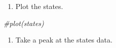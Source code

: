 \documentclass[
]{book}
\newenvironment{Shaded}{\begin{snugshade}}{\end{snugshade}}
\newcommand{\CommentTok}[1]{\textcolor[rgb]{0.56,0.35,0.01}{\textit{#1}}}
\providecommand{\tightlist}{%
  \setlength{\itemsep}{0pt}\setlength{\parskip}{0pt}}
\begin{document}
\begin{enumerate}
\def\labelenumi{\arabic{enumi}.}
\setcounter{enumi}{10}
\tightlist
\item
  Plot the states.
\end{enumerate}

\begin{Shaded}
\begin{Highlighting}[]
\CommentTok{#plot(states)}
\end{Highlighting}
\end{Shaded}

\begin{enumerate}
\def\labelenumi{\arabic{enumi}.}
\setcounter{enumi}{11}
\tightlist
\item
  Take a peak at the states data.
\end{enumerate}
\end{document}
